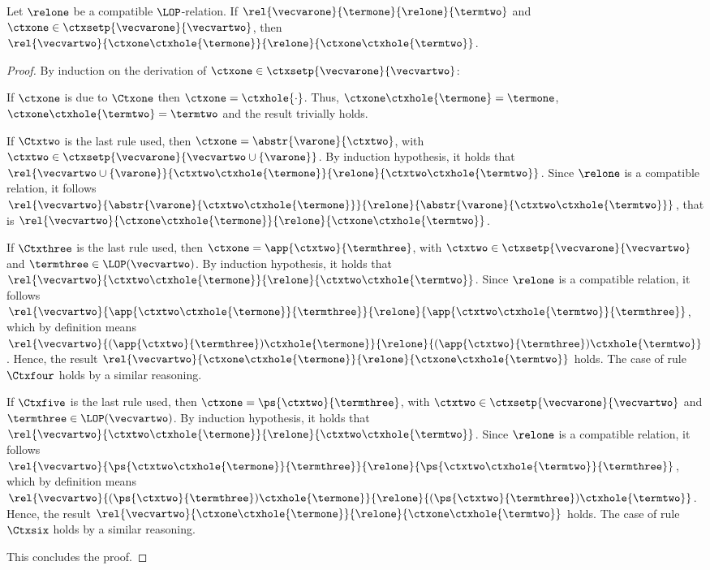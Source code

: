 \begin{lemma}\label{lemma:ctxcomprel}
  Let $\relone$ be a compatible $\LOP$-relation. If
  $\rel{\vecvarone}{\termone}{\relone}{\termtwo}$ and
  $\ctxone\in\ctxsetp{\vecvarone}{\vecvartwo}$, then
  $\rel{\vecvartwo}{\ctxone\ctxhole{\termone}}{\relone}{\ctxone\ctxhole{\termtwo}}$.
\end{lemma}
\begin{proof}
  By induction on the derivation of
  $\ctxone\in\ctxsetp{\vecvarone}{\vecvartwo}$:
  \begin{varitemize}
  \item If $\ctxone$ is due to $\Ctxone$ then $\ctxone =
    \ctxhole{\cdot}$. Thus, $\ctxone\ctxhole{\termone} = \termone$,
    $\ctxone\ctxhole{\termtwo} = \termtwo$ and the result trivially holds.
  \item If $\Ctxtwo$ is the last rule used, then $\ctxone =
    \abstr{\varone}{\ctxtwo}$, with
    $\ctxtwo\in\ctxsetp{\vecvarone}{\vecvartwo\cup\{\varone\}}$. By
    induction hypothesis, it holds that
    $\rel{\vecvartwo\cup\{\varone\}}{\ctxtwo\ctxhole{\termone}}{\relone}{\ctxtwo\ctxhole{\termtwo}}$. Since
    $\relone$ is a compatible relation, it follows
    $\rel{\vecvartwo}{\abstr{\varone}{\ctxtwo\ctxhole{\termone}}}{\relone}{\abstr{\varone}{\ctxtwo\ctxhole{\termtwo}}}$,
    that is
    $\rel{\vecvartwo}{\ctxone\ctxhole{\termone}}{\relone}{\ctxone\ctxhole{\termtwo}}$.
  \item If $\Ctxthree$ is the last rule used, then $\ctxone =
    \app{\ctxtwo}{\termthree}$, with
    $\ctxtwo\in\ctxsetp{\vecvarone}{\vecvartwo}$ and
    $\termthree\in\LOP(\vecvartwo)$. By induction hypothesis, it holds that
    $\rel{\vecvartwo}{\ctxtwo\ctxhole{\termone}}{\relone}{\ctxtwo\ctxhole{\termtwo}}$.
    Since $\relone$ is a compatible relation, it follows
    $\rel{\vecvartwo}{\app{\ctxtwo\ctxhole{\termone}}{\termthree}}{\relone}{\app{\ctxtwo\ctxhole{\termtwo}}{\termthree}}$,
    which by definition means
    $\rel{\vecvartwo}{(\app{\ctxtwo}{\termthree})\ctxhole{\termone}}{\relone}{(\app{\ctxtwo}{\termthree})\ctxhole{\termtwo}}$. Hence,
    the result
    $\rel{\vecvartwo}{\ctxone\ctxhole{\termone}}{\relone}{\ctxone\ctxhole{\termtwo}}$
    holds. The case of rule $\Ctxfour$ holds by a similar reasoning.
  \item If $\Ctxfive$ is the last rule used, then $\ctxone =
    \ps{\ctxtwo}{\termthree}$, with
    $\ctxtwo\in\ctxsetp{\vecvarone}{\vecvartwo}$ and
    $\termthree\in\LOP(\vecvartwo)$. By induction hypothesis, it holds that
    $\rel{\vecvartwo}{\ctxtwo\ctxhole{\termone}}{\relone}{\ctxtwo\ctxhole{\termtwo}}$.
    Since $\relone$ is a compatible relation, it follows
    $\rel{\vecvartwo}{\ps{\ctxtwo\ctxhole{\termone}}{\termthree}}{\relone}{\ps{\ctxtwo\ctxhole{\termtwo}}{\termthree}}$,
    which by definition means
    $\rel{\vecvartwo}{(\ps{\ctxtwo}{\termthree})\ctxhole{\termone}}{\relone}{(\ps{\ctxtwo}{\termthree})\ctxhole{\termtwo}}$. Hence,
    the result
    $\rel{\vecvartwo}{\ctxone\ctxhole{\termone}}{\relone}{\ctxone\ctxhole{\termtwo}}$
    holds. The case of rule $\Ctxsix$ holds by a similar reasoning.
  \end{varitemize}
  This concludes the proof.
\end{proof}

